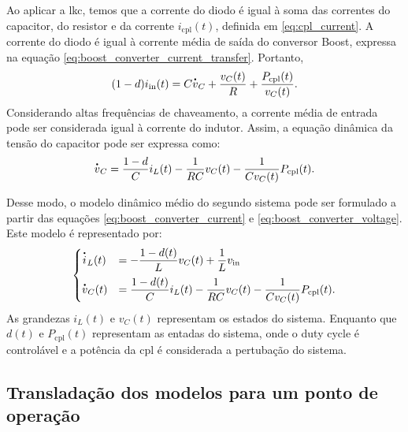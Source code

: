 Ao aplicar a \acrshort{lkc}, temos que a corrente do diodo é igual à soma das correntes do capacitor, do resistor e da corrente $i_{\mathrm{cpl}}(t)$, definida em \eqref{eq:cpl_current}. A corrente do diodo é igual à corrente média de saída do conversor Boost, expressa na equação \eqref{eq:boost_converter_current_transfer}. Portanto, \begin{equation} (1 - d) i_{\mathrm{in}}(t) = C\dt{v}_C + \frac{v_C(t)}{R} + \frac{P_{\mathrm{cpl}}(t)}{v_C(t)}.\end{equation} Considerando altas frequências de chaveamento, a corrente média de entrada pode ser considerada igual à corrente do indutor. Assim, a equação dinâmica da tensão do capacitor pode ser expressa como: \begin{equation} \dt{v}_C = \frac{1 - d}{C} i_L(t) - \frac{1}{RC}v_C(t) - \frac{1}{Cv_C(t)}P_{\mathrm{cpl}}(t). \label{eq:boost_converter_voltage}\end{equation}

Desse modo, o modelo dinâmico médio do segundo sistema pode ser formulado a partir das equações \eqref{eq:boost_converter_current} e \eqref{eq:boost_converter_voltage}. Este modelo é representado por: \begin{equation} \begin{cases} \dt{i}_L(t) &= \displaystyle - \frac{1-d(t)}{L}v_C(t) + \frac{1}{L}v_{\mathrm{in}} \\[8pt] \dt{v}_C(t) &= \displaystyle \frac{1 - d(t)}{C} i_L(t) - \frac{1}{RC}v_C(t) - \frac{1}{Cv_C(t)}P_{\mathrm{cpl}}(t). \label{eq:boost_nonlinear_system}\end{cases} \end{equation} As grandezas $i_L(t)$ e $v_C(t)$ representam os estados do sistema. Enquanto que $d(t)$ e $P_{\mathrm{cpl}}(t)$ representam as entadas do sistema, onde o duty cycle é controlável e a potência da \acrshort{cpl} é considerada a pertubação do sistema.

\subsection{Transladação dos modelos para um ponto de operação}

